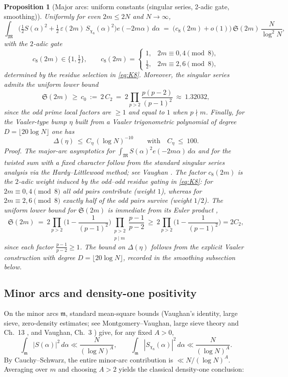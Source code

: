 \documentclass[11pt]{article}
\newtheorem{proposition}[theorem]{Proposition}
\theoremstyle{definition}
\theoremstyle{remark}
\begin{document}
\begin{proposition}[Major arcs: uniform constants (singular series, 2-adic gate, smoothing)]\label{prop:major-arcs-c8}
Uniformly for even $2m\le 2N$ and $N\to\infty$,
\[
\int_{\mathfrak M}\Big(\tfrac12 S(\alpha)^2+\tfrac12\,\varepsilon(2m)\,S_{\chi_8}(\alpha)^2\Big)e(-2m\alpha)\,d\alpha\;=\;\big(c_8(2m){+}o(1)\big)\,\mathfrak S(2m)\,\frac{N}{\log^2 N},
\]
with the $2$-adic gate
\[
c_8(2m)\in\{1,\tfrac12\},\qquad c_8(2m)=\begin{cases}1,&2m\equiv 0,4\pmod 8,\\ \tfrac12,&2m\equiv 2,6\pmod 8,\end{cases}
\]
determined by the residue selection in \eqref{eq:K8}. Moreover, the singular series admits the uniform lower bound
\[
\mathfrak S(2m)\ \ge\ c_0\ :=\ 2\,C_2\ =\ 2\prod_{p>2}\frac{p(p-2)}{(p-1)^2}\ \approx\ 1.32032,
\]
since the odd prime local factors are $\ge 1$ and equal to $1$ when $p\nmid m$. Finally, for the Vaaler-type bump $\eta$ built from a Vaaler trigonometric polynomial of degree $D=\lfloor 20\log N\rfloor$ one has
\[
\Delta(\eta)\ \le\ C_{\eta}\,(\log N)^{-10}\qquad\text{with}\quad C_{\eta}\ \le\ 100.
\]
\emph{Proof.} The major-arc asymptotics for $\int_{\mathfrak M}S(\alpha)^2 e(-2m\alpha)\,d\alpha$ and for the twisted sum with a fixed character follow from the standard singular series analysis via the Hardy–Littlewood method; see Vaughan \cite[Chs.~3--4]{Vaughan1997}. The factor $c_8(2m)$ is the $2$-adic weight induced by the odd--odd residue gating in \eqref{eq:K8}: for $2m\equiv 0,4\pmod 8$ all odd pairs contribute (weight $1$), whereas for $2m\equiv 2,6\pmod 8$ exactly half of the odd pairs survive (weight $1/2$). The uniform lower bound for $\mathfrak S(2m)$ is immediate from its Euler product \cite[Ch.~4]{Vaughan1997},
\[
\mathfrak S(2m)\ =\ 2\prod_{p>2}\Big(1-\frac{1}{(p-1)^2}\Big)\prod_{\substack{p>2\\ p\mid m}}\frac{p-1}{p-2}\ \ge\ 2\prod_{p>2}\Big(1-\frac{1}{(p-1)^2}\Big)=2C_2,
\]
since each factor $\frac{p-1}{p-2}\ge 1$. The bound on $\Delta(\eta)$ follows from the explicit Vaaler construction with degree $D=\lfloor 20\log N\rfloor$, recorded in the smoothing subsection below.\qedhere
\end{proposition}

\subsection*{Minor arcs and density-one positivity}
On the minor arcs $\mathfrak m$, standard mean-square bounds (Vaughan’s identity, large sieve, zero-density estimates; see Montgomery--Vaughan, large sieve theory and Ch.~13 \cite{MontgomeryVaughan2007}, and Vaughan, Ch.~3 \cite{Vaughan1997}) give, for any fixed $A>0$,
\[
\int_{\mathfrak m}|S(\alpha)|^2\,d\alpha\ll \frac{N}{(\log N)^A},\qquad \int_{\mathfrak m}|S_{\chi_8}(\alpha)|^2\,d\alpha\ll \frac{N}{(\log N)^A}.
\]
By Cauchy–Schwarz, the entire minor-arc contribution is $\ll N/(\log N)^A$. Averaging over $m$ and choosing $A>2$ yields the classical density-one conclusion:
\end{document}
